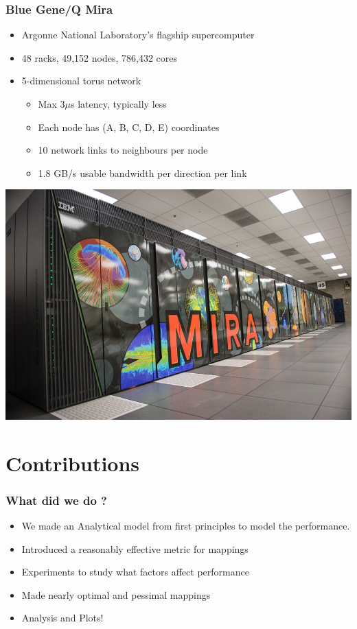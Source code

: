 \documentclass{beamer}
\begin{document}
\begin{frame}
\frametitle{Blue Gene/Q Mira}
\begin{itemize}
\item Argonne National Laboratory's flagship supercomputer
\item 48 racks, 49,152 nodes, 786,432 cores
\item 5-dimensional torus network
  \begin{itemize}
    \item Max 3$\mu$s latency, typically less
    \item Each node has (A, B, C, D, E) coordinates
    \item 10 network links to neighbours per node
    \item 1.8 GB/s usable bandwidth per direction per link
  \end{itemize}
\end{itemize}
\centering
\includegraphics[width=0.5\linewidth]{mira}
\end{frame}

\section{Contributions}
\begin{frame}
\frametitle{What did we do ?}
\begin{itemize}
\item We made an Analytical model from first principles to model the performance.
\item Introduced a reasonably effective metric for mappings
\item Experiments to study what factors affect performance
\item Made nearly optimal and pessimal mappings
\item Analysis and Plots!
\end{itemize}
\end{frame}
\end{document}
